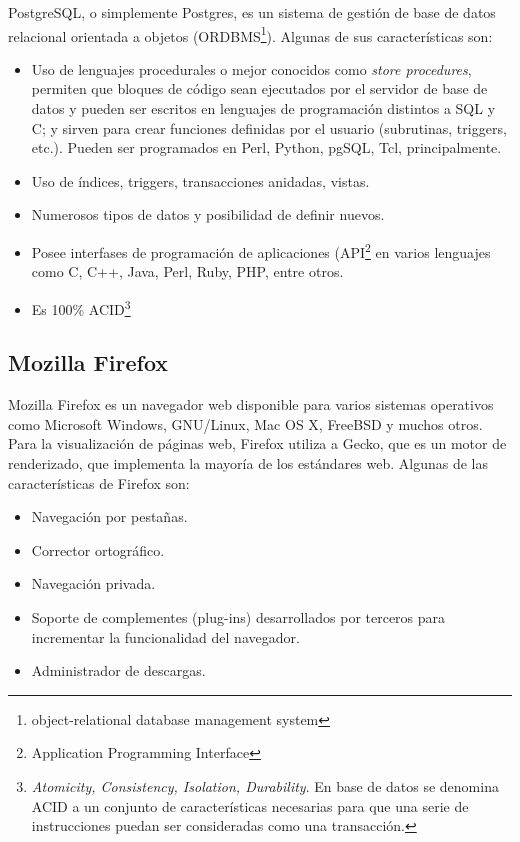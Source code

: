 PostgreSQL, o simplemente Postgres, es un sistema de gestión de base de datos relacional orientada a objetos (ORDBMS\footnote{object-relational database management system}). Algunas de sus características son:

\begin{itemize}
 \item Uso de lenguajes procedurales o mejor conocidos como \textit{store procedures}, permiten que bloques de código sean ejecutados por el servidor de base de datos y pueden ser escritos en lenguajes de programación distintos a SQL y C; y sirven para crear funciones definidas por el usuario (subrutinas, triggers, etc.). Pueden ser programados en Perl, Python, pgSQL, Tcl, principalmente.
 \item Uso de índices, triggers, transacciones anidadas, vistas.
 \item Numerosos tipos de datos y posibilidad de definir nuevos.
 \item Posee interfases de programación de aplicaciones (API\footnote{Application Programming Interface} en varios lenguajes como C, C++, Java, Perl, Ruby, PHP, entre otros.
 \item Es 100\% ACID\footnote{\textit{Atomicity, Consistency, Isolation, Durability}. En base de datos se denomina ACID a un conjunto de características necesarias para que una serie de instrucciones puedan ser consideradas como una transacción.}
\end{itemize}

\subsection{Mozilla Firefox}
\label{sec:firefox}

Mozilla Firefox es un navegador web disponible para varios sistemas operativos como Microsoft Windows, GNU/Linux, Mac OS X, FreeBSD y muchos otros. Para la visualización de páginas web, Firefox utiliza a Gecko, que es un motor de renderizado, que implementa la mayoría de los estándares web. Algunas de las características de Firefox son:

\begin{itemize}
 \item Navegación por pestañas.
 \item Corrector ortográfico.
 \item Navegación privada.
 \item Soporte de complementes (plug-ins) desarrollados por terceros para incrementar la funcionalidad del navegador.
 \item Administrador de descargas.
\end{itemize}

